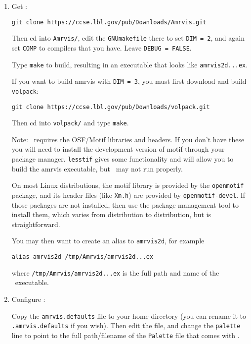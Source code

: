 \begin{enumerate}

\item Get \amrvis:

\begin{verbatim}
git clone https://ccse.lbl.gov/pub/Downloads/Amrvis.git
\end{verbatim}

Then cd into {\tt Amrvis/}, edit the {\tt GNUmakefile} there
to set {\tt DIM = 2}, and again set {\tt COMP} to compilers that
you have. Leave {\tt DEBUG = FALSE}.

Type {\tt make} to build, resulting in an executable that
looks like {\tt amrvis2d...ex}.

If you want to build amrvis with {\tt DIM = 3}, you must first
download and build {\tt volpack}:
\begin{verbatim}
git clone https://ccse.lbl.gov/pub/Downloads/volpack.git
\end{verbatim}

Then cd into {\tt volpack/} and type {\tt make}.

Note: \amrvis\ requires the OSF/Motif libraries and headers. If you don't have these 
you will need to install the development version of motif through your package manager. 
{\tt lesstif} gives some functionality and will allow you to build the amrvis executable, 
but \amrvis\ may not run properly.

On most Linux distributions, the motif library is provided by the
{\tt openmotif} package, and its header files (like {\tt Xm.h}) are provided
by {\tt openmotif-devel}. If those packages are not installed, then use the
package management tool to install them, which varies from
distribution to distribution, but is straightforward. 

You may then want to create an alias to {\tt amrvis2d}, for example
\begin{verbatim}
alias amrvis2d /tmp/Amrvis/amrvis2d...ex
\end{verbatim}
where {\tt /tmp/Amrvis/amrvis2d...ex} is the full path and name of the \amrvis\ executable.

\item Configure \amrvis:  

  Copy the {\tt amrvis.defaults} file to your home directory (you can
  rename it to {\tt .amrvis.defaults} if you wish).  Then edit the
  file, and change the {\tt palette} line to point to the full
  path/filename of the {\tt Palette} file that comes with \amrvis.


\end{enumerate}
